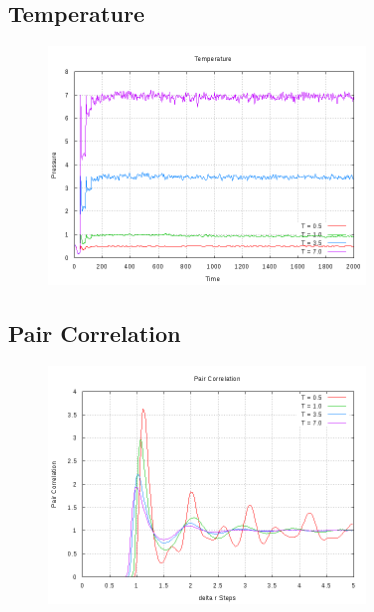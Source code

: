 \documentclass[letterpaper,12pt]{article}
\numberwithin{equation}{subsection}
\begin{document}
\subsection{Temperature}
\begin{figure}[H]
                \centering
                \includegraphics[width=0.75\textwidth]{temp.png}
\end{figure}
\subsection{Pair Correlation}
\begin{figure}[H]
                \centering
                \includegraphics[width=0.75\textwidth]{pair_corre.png}
\end{figure}
\end{document}
